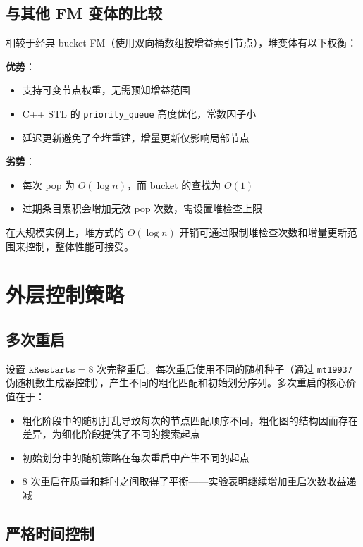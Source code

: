 \documentclass[journal, twocolumn]{IEEEtran}
\begin{document}
\subsection{与其他 FM 变体的比较}

相较于经典 bucket-FM（使用双向桶数组按增益索引节点），堆变体有以下权衡：

\textbf{优势}：
\begin{itemize}
    \item 支持可变节点权重，无需预知增益范围
    \item C++ STL 的 \texttt{priority\_queue} 高度优化，常数因子小
    \item 延迟更新避免了全堆重建，增量更新仅影响局部节点
\end{itemize}

\textbf{劣势}：
\begin{itemize}
    \item 每次 pop 为 $O(\log n)$，而 bucket 的查找为 $O(1)$
    \item 过期条目累积会增加无效 pop 次数，需设置堆检查上限
\end{itemize}

在大规模实例上，堆方式的 $O(\log n)$ 开销可通过限制堆检查次数和增量更新范围来控制，整体性能可接受。

\section{外层控制策略}

\subsection{多次重启}

设置 $\texttt{kRestarts} = 8$ 次完整重启。每次重启使用不同的随机种子（通过 \texttt{mt19937} 伪随机数生成器控制），产生不同的粗化匹配和初始划分序列。多次重启的核心价值在于：

\begin{itemize}
    \item 粗化阶段中的随机打乱导致每次的节点匹配顺序不同，粗化图的结构因而存在差异，为细化阶段提供了不同的搜索起点
    \item 初始划分中的随机策略在每次重启中产生不同的起点
    \item 8 次重启在质量和耗时之间取得了平衡——实验表明继续增加重启次数收益递减
\end{itemize}

\subsection{严格时间控制}
\end{document}
